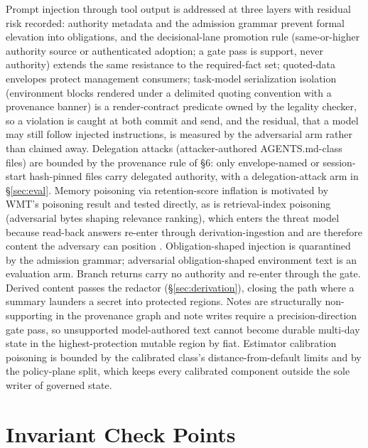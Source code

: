 \documentclass[11pt]{article}
\begin{document}
Prompt injection through tool output is addressed at three layers with residual risk recorded: authority metadata and the admission grammar prevent formal elevation into obligations, and the decisional-lane promotion rule (same-or-higher authority source or authenticated adoption; a gate pass is support, never authority) extends the same resistance to the required-fact set; quoted-data envelopes protect management consumers; task-model serialization isolation (environment blocks rendered under a delimited quoting convention with a provenance banner) is a render-contract predicate owned by the legality checker, so a violation is caught at both commit and send, and the residual, that a model may still follow injected instructions, is measured by the adversarial arm rather than claimed away. Delegation attacks (attacker-authored AGENTS.md-class files) are bounded by the provenance rule of \S6: only envelope-named or session-start hash-pinned files carry delegated authority, with a delegation-attack arm in \S\ref{sec:eval}. Memory poisoning via retention-score inflation is motivated by WMT's poisoning result and tested directly, as is retrieval-index poisoning (adversarial bytes shaping relevance ranking), which enters the threat model because read-back answers re-enter through derivation-ingestion and are therefore content the adversary can position \cite{wmt2026}. Obligation-shaped injection is quarantined by the admission grammar; adversarial obligation-shaped environment text is an evaluation arm. Branch returns carry no authority and re-enter through the gate. Derived content passes the redactor (\S\ref{sec:derivation}), closing the path where a summary launders a secret into protected regions. Notes are structurally non-supporting in the provenance graph and note writes require a precision-direction gate pass, so unsupported model-authored text cannot become durable multi-day state in the highest-protection mutable region by fiat. Estimator calibration poisoning is bounded by the calibrated class's distance-from-default limits and by the policy-plane split, which keeps every calibrated component outside the sole writer of governed state.

\section{Invariant Check Points}
\label{sec:invariants}
\end{document}
